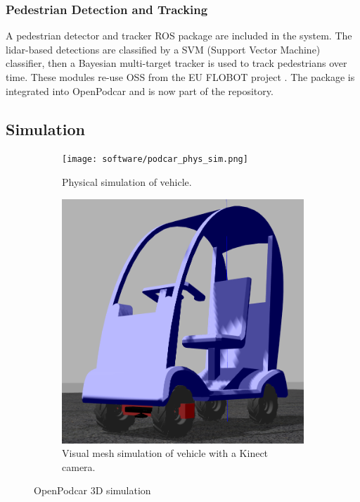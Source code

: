 \documentclass[a4paper]{article}
\begin{document}
	\subsubsection{Pedestrian Detection and Tracking}
	
	A pedestrian detector and tracker ROS package are included in the system.  The lidar-based detections are classified by a SVM (Support Vector Machine) classifier, then a Bayesian multi-target tracker is used to track pedestrians over time. These modules re-use OSS from the EU FLOBOT project \cite{yan2020robot}. The package is integrated into OpenPodcar and is now part of the repository.
	
	
	\subsection{Simulation}
	
	\begin{figure}
		\centering
		\begin{subfigure}{0.45\textwidth}
			\centering
			\texttt{[image: software/podcar\_phys\_sim.png]}
			\caption{Physical simulation of vehicle.}
			\label{fig:physSim}
		\end{subfigure}	
		\quad
		\begin{subfigure}{0.45\textwidth}
			\centering
			\includegraphics[width=0.75\columnwidth]{software/podcar_sim.png}
			\caption{Visual mesh simulation of vehicle with a Kinect camera.}
			\label{fig:meshSim}
		\end{subfigure}
		\caption{OpenPodcar 3D simulation}
	\end{figure}
	
\end{document}

